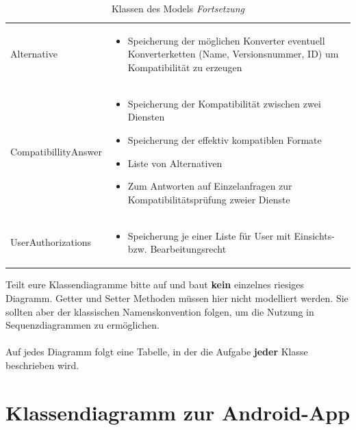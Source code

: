 \begin{table}
\begin{tabularx}{\textwidth}{p{} | X}
		Alternative & \compress \begin{itemize}
			\item Speicherung der möglichen Konverter eventuell Konverterketten (Name, Versionsnummer, ID) um Kompatibilität zu erzeugen
		\end{itemize}\\
		\rowcolor[HTML]{E7E7E7}
		CompatibillityAnswer & \compress \begin{itemize}
			\item Speicherung der Kompatibilität zwischen zwei Diensten
			\item Speicherung der effektiv kompatiblen Formate
			\item Liste von Alternativen
			\item Zum Antworten auf Einzelanfragen zur Kompatibilitätsprüfung zweier Dienste
		\end{itemize}\\
		UserAuthorizations & \compress \begin{itemize}
			\item Speicherung je einer Liste für User mit Einsichts- bzw. Bearbeitungsrecht
		\end{itemize}\\
	\end{tabularx}
	\caption{Klassen des Models \textit{Fortsetzung}}
\end{table}

\begin{tcolorbox}
Teilt eure Klassendiagramme bitte auf und baut \textbf{kein} einzelnes riesiges Diagramm.
Getter und Setter Methoden müssen hier nicht modelliert werden.
Sie sollten aber der klassischen Namenskonvention folgen, um die Nutzung in Sequenzdiagrammen zu ermöglichen.
\\\\
Auf jedes Diagramm folgt eine Tabelle, in der die Aufgabe \textbf{jeder} Klasse beschrieben wird.
\end{tcolorbox}

\section*{Klassendiagramm zur Android-App}

